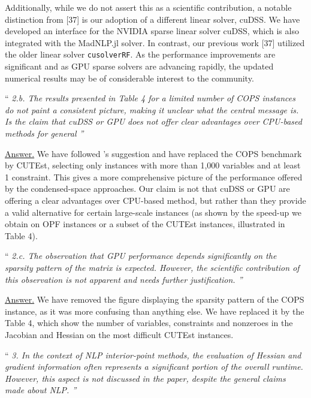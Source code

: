 \documentclass[10pt,a4paper]{article}
\newenvironment{quotereviewer}{\vspace{.5cm}{\underline\reviewername} ``\it\footnotesize}{''}
\newcommand{\answer}{\vspace{1mm}\underline{Answer.} }
\begin{document}
Additionally, while we do not assert this as a scientific contribution, a notable distinction from [37] is our adoption of a different linear solver, cuDSS. We have developed an interface for the NVIDIA sparse linear solver cuDSS, which is also integrated with the MadNLP.jl solver. In contrast, our previous work [37] utilized the older linear solver {\tt cusolverRF}. As the performance improvements are significant and as GPU sparse solvers are advancing rapidly, the updated numerical results may be of considerable interest to the community.
 
\begin{quotereviewer}
2.b. The results presented in Table 4 for a limited number of COPS instances do not paint
a consistent picture, making it unclear what the central message is. Is the claim that
cuDSS or GPU does not offer clear advantages over CPU-based methods for general
\end{quotereviewer}

\answer
We have followed \reviewername's suggestion and have replaced the COPS benchmark
by CUTEst, selecting only instances with more than 1,000 variables
and at least 1 constraint. This gives a more comprehensive picture of the
performance offered by the condensed-space approaches.
Our claim is not that cuDSS or GPU are offering a clear advantages over CPU-based
method, but rather than they provide a valid alternative for certain large-scale instances
(as shown by the speed-up we obtain on OPF instances or a subset of the CUTEst instances, illustrated in Table 4).

\begin{quotereviewer}
2.c. The observation that GPU performance depends signiﬁcantly on the sparsity pattern of
the matrix is expected. However, the scientiﬁc contribution of this observation is not
apparent and needs further justiﬁcation.
\end{quotereviewer}

\answer
We have removed the figure displaying the sparsity pattern of the COPS instance,
as it was more confusing than anything else. We have replaced it by the Table 4, which
show the number of variables, constraints and nonzeroes in the Jacobian and Hessian
on the most difficult CUTEst instances.

\begin{quotereviewer}
3. In the context of NLP interior-point methods, the evaluation of Hessian and gradient information often represents a signiﬁcant portion of the overall runtime. However, this aspect is
not discussed in the paper, despite the general claims made about NLP.
\end{quotereviewer}
\end{document}
